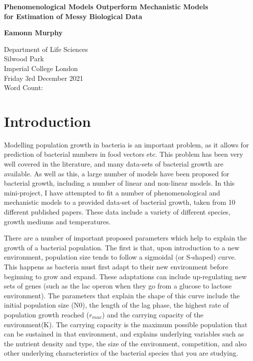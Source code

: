 \documentclass[11pt,a4wide,titlepage]{article}
\begin{document}
\begin{titlepage}
	\begin{center}
		\vspace*{1cm}
		
		\begin{Large}
			\textbf{Phenomenological Models Outperform Mechanistic Models\\
				for Estimation of Messy Biological Data}
		\end{Large}
		
		
		\vspace{1.5cm}
		
		\textbf{Eamonn Murphy}
		
		\vfill
		
		Department of Life Sciences\\
		Silwood Park\\
		Imperial College London\\
		\vspace{\baselineskip}
		Friday 3rd December 2021\\
		\vspace{\baselineskip}
		Word Count: 
		\vfill
		
	\end{center}
\end{titlepage}

\section*{Introduction}
Modelling population growth in bacteria is an important problem, as it allows for prediction of bacterial numbers in food vectors etc. This problem has been very well covered in the literature, and many data-sets of bacterial growth are available. As well as this, a large number of models have been proposed for bacterial growth, including a number of linear and non-linear models. In this mini-project, I have attempted to fit a number of phenomenological and mechanistic models to a provided data-set of bacterial growth, taken from 10 different published papers. These data include a variety of different species, growth mediums and temperatures.

There are a number of important proposed parameters which help to explain the growth of a bacterial population. The first is that, upon introduction to a new environment, population size tends to follow a sigmoidal (or S-shaped) curve. This happens as bacteria must first adapt to their new environment before beginning to grow and expand. These adaptations can include up-regulating new sets of genes (such as the lac operon when they go from a glucose to lactose environment). The parameters that explain the shape of this curve include the initial population size (N0), the length of the lag phase, the highest rate of population growth reached ($r_{max}$) and the carrying capacity  of the environment(K). The carrying capacity is the maximum possible population that can be sustained in that environment, and explains underlying variables such as the nutrient density and type, the size of the environment, competition, and also other underlying characteristics of the bacterial species that you are studying.
\end{document}
